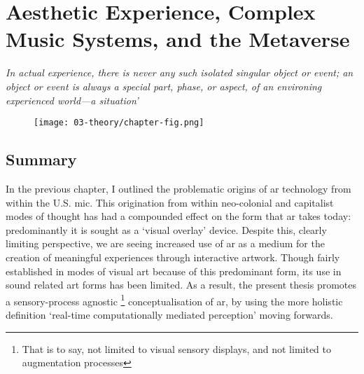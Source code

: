 \chapter{Aesthetic Experience, Complex Music Systems, and the Metaverse}
\label{sec: theory}
\epigraph{\emph{In actual experience, there is never any such isolated singular object or event; an object or event is always a special part, phase, or aspect, of an environing experienced world—a situation'}}{\citep[p. 67]{dewey1934}}

\begin{figure}
    \centering
    \texttt{[image: 03-theory/chapter-fig.png]}
    \captionsetup{labelformat=empty}
    \caption[\autoref*{sec: theory}'s page-figure: Three photographs from the Sensory Cartographies project, (from , \citeyear{tonn2017})]{}
\end{figure}

\clearpage
\section{Summary}\label{sec: theory-summary}
In the previous chapter, I outlined the problematic origins of \gls{ar} technology from within the U.S. \gls{mic}. This origination from within neo-colonial and capitalist modes of thought has had a compounded effect on the form that \gls{ar} takes today: predominantly it is sought as a `visual overlay' device. Despite this, clearly limiting perspective, we are seeing increased use of \gls{ar} as a medium for the creation of meaningful experiences through interactive artwork. Though fairly established in modes of visual art because of this predominant form, its use in sound related art forms has been limited. As a result, the present thesis promotes a sensory-process agnostic \footnote{That is to say, not limited to visual sensory displays, and not limited to augmentation processes} conceptualisation of \gls{ar}, by using the more holistic definition `real-time computationally mediated perception' \citep{kiefer2018} moving forwards. 

